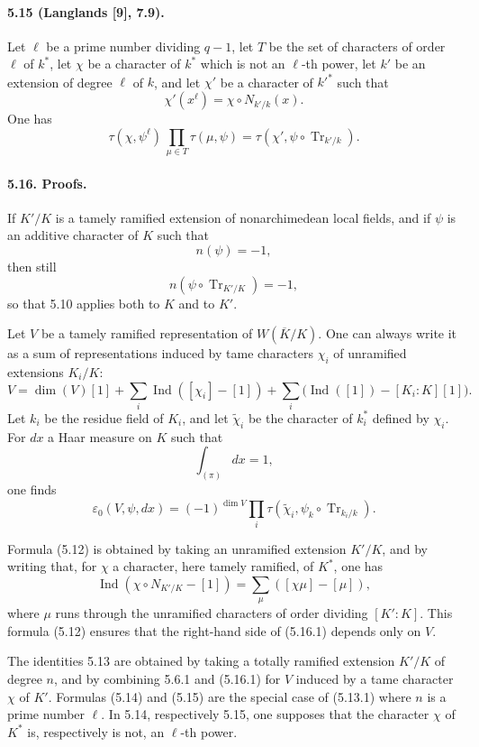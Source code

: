 \documentclass[10pt,letterpaper]{article}
\newcommand{\Ind}{\operatorname{Ind}}
\newcommand{\Tr}{\operatorname{Tr}}
\providecommand{\Tr}{\operatorname{Tr}}
\providecommand{\Tr}{\operatorname{Tr}}
\providecommand{\Tr}{\operatorname{Tr}}
\providecommand{\Ind}{\operatorname{Ind}}
\begin{document}
\paragraph{5.15 (Langlands [9], 7.9).} Let \(\ell\) be a prime number dividing \(q-1\), let \(T\) be the set of characters of order \(\ell\) of \(k^*\), let \(\chi\) be a character of \(k^*\) which is not an \(\ell\)-th power, let \(k'\) be an extension of degree \(\ell\) of \(k\), and let \(\chi'\) be a character of \(k'^*\) such that
\[
\chi'(x^\ell)=\chi\circ N_{k'/k}(x).
\]
One has
\[
\tau(\chi,\psi^\ell)\,
\prod_{\mu\in T}\tau(\mu,\psi)
=
\tau(\chi',\psi\circ\Tr_{k'/k}).
\]

\paragraph{5.16. Proofs.} If \(K'/K\) is a tamely ramified extension of nonarchimedean local fields, and if \(\psi\) is an additive character of \(K\) such that
\[
n(\psi)=-1,
\]
then still
\[
n(\psi\circ\Tr_{K'/K})=-1,
\]
so that 5.10 applies both to \(K\) and to \(K'\).

Let \(V\) be a tamely ramified representation of \(W(\overline K/K)\). One can always write it as a sum of representations induced by tame characters \(\chi_i\) of unramified extensions \(K_i/K\):
\[
V=\dim(V)[1]+\sum_i\Ind([\chi_i]-[1])
+\sum_i\bigl(\Ind([1])-[K_i:K][1]\bigr).
\]
Let \(k_i\) be the residue field of \(K_i\), and let \(\widetilde\chi_i\) be the character of \(k_i^*\) defined by \(\chi_i\). For \(dx\) a Haar measure on \(K\) such that
\[
\int_{(\pi)}dx=1,
\]
one finds
\[
\tag{5.16.1}
\varepsilon_0(V,\psi,dx)
=
(-1)^{\dim V}
\prod_i\tau(\widetilde\chi_i,\psi_k\circ\Tr_{k_i/k}).
\]

Formula (5.12) is obtained by taking an unramified extension \(K'/K\), and by writing that, for \(\chi\) a character, here tamely ramified, of \(K^*\), one has
\[
\Ind(\chi\circ N_{K'/K}-[1])
=
\sum_\mu([\chi\mu]-[\mu]),
\]
where \(\mu\) runs through the unramified characters of order dividing \([K':K]\). This formula (5.12) ensures that the right-hand side of (5.16.1) depends only on \(V\).

The identities 5.13 are obtained by taking a totally ramified extension \(K'/K\) of degree \(n\), and by combining 5.6.1 and (5.16.1) for \(V\) induced by a tame character \(\chi\) of \(K'\). Formulas (5.14) and (5.15) are the special case of (5.13.1) where \(n\) is a prime number \(\ell\). In 5.14, respectively 5.15, one supposes that the character \(\chi\) of \(K^*\) is, respectively is not, an \(\ell\)-th power.
\end{document}
